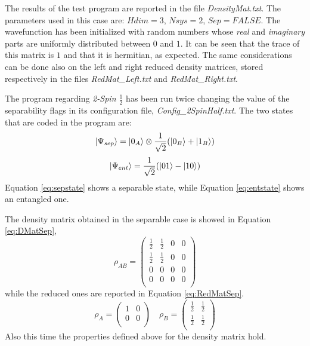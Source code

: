 \documentclass[11pt,a4paper]{article}
\begin{document}
The results of the test program are reported in the file \textit{DensityMat.txt}. The parameters used in this case are: $Hdim = 3$, $Nsys = 2$, $Sep  = FALSE$. The wavefunction has been initialized with random numbers whose \textit{real} and \textit{imaginary} parts are uniformly distributed between $0$ and $1$.
It can be seen that the trace of this matrix is $1$ and that it is hermitian, as expected.
The same considerations can be done also on the left and right reduced density matrices, stored respectively in the files \textit{RedMat\_Left.txt} and \textit{RedMat\_Right.txt}.

The program regarding \textit{2-Spin $\frac{1}{2}$} has been run twice changing the value of the separability flags in its configuration file, \textit{Config\_2SpinHalf.txt}. The two states that are coded in the program are:
\begin{equation}
\ket{\Psi_{sep}} = \ket{0_A} \otimes \frac{1}{\sqrt{2}} (\ket{0_B} + \ket{1_B})
\label{eq:sepstate}
\end{equation}
\begin{equation}
\ket{\Psi_{ent}} = \frac{1}{\sqrt{2}} (\ket{01} - \ket{10})
\label{eq:entstate}
\end{equation}
Equation \ref{eq:sepstate} shows a separable state, while Equation \ref{eq:entstate} shows an entangled one.

The density matrix obtained in the separable case is showed in Equation \ref{eq:DMatSep},
\begin{equation}
\rho_{AB} =
\begin{pmatrix}
	\frac{1}{2} & \frac{1}{2} & 0 & 0\\
	\frac{1}{2} & \frac{1}{2} & 0 & 0\\
	0 & 0 & 0 & 0\\
	0 & 0 & 0 & 0\\
\end{pmatrix}
\label{eq:DMatSep}
\end{equation}
while the reduced ones are reported in Equation \ref{eq:RedMatSep}.
\begin{equation}
\rho_{A} =
\begin{pmatrix}
	1 & 0\\
	0 & 0\\
\end{pmatrix}
\quad
\rho_{B} = 
\begin{pmatrix}
	\frac{1}{2} & \frac{1}{2}\\
	\frac{1}{2} & \frac{1}{2}\\
\end{pmatrix}
\label{eq:RedMatSep}
\end{equation}
Also this time the properties defined above for the density matrix hold.
\end{document}
